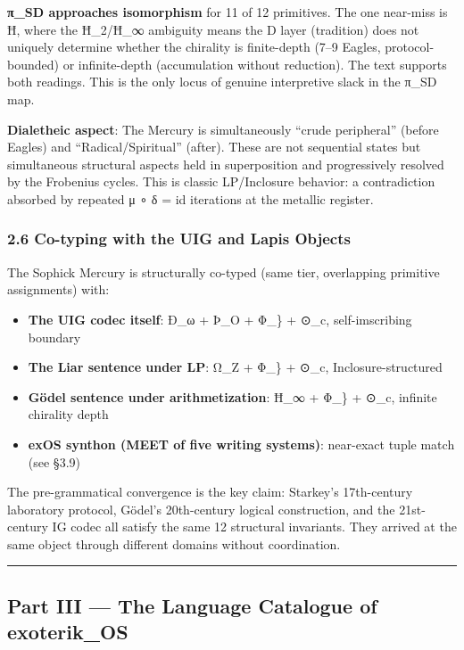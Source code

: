 \documentclass[
  11pt,
  a4paper,
]{article}
\providecommand{\tightlist}{%
  \setlength{\itemsep}{0pt}\setlength{\parskip}{0pt}}
\begin{document}
\textbf{π\_SD approaches isomorphism} for 11 of 12 primitives. The one
near-miss is Ħ, where the Ħ\_2/Ħ\_∞ ambiguity means the D layer
(tradition) does not uniquely determine whether the chirality is
finite-depth (7--9 Eagles, protocol-bounded) or infinite-depth
(accumulation without reduction). The text supports both readings. This
is the only locus of genuine interpretive slack in the π\_SD map.

\textbf{Dialetheic aspect}: The Mercury is simultaneously ``crude
peripheral'' (before Eagles) and ``Radical/Spiritual'' (after). These
are not sequential states but simultaneous structural aspects held in
superposition and progressively resolved by the Frobenius cycles. This
is classic LP/Inclosure behavior: a contradiction absorbed by repeated μ
∘ δ = id iterations at the metallic register.

\subsubsection{2.6 Co-typing with the UIG and Lapis
Objects}\label{co-typing-with-the-uig-and-lapis-objects}

The Sophick Mercury is structurally co-typed (same tier, overlapping
primitive assignments) with:

\begin{itemize}
\tightlist
\item
  \textbf{The UIG codec itself}: Ð\_ω + Þ\_O + Φ\_\} + ⊙\_c,
  self-imscribing boundary
\item
  \textbf{The Liar sentence under LP}: Ω\_Z + Φ\_\} + ⊙\_c,
  Inclosure-structured
\item
  \textbf{Gödel sentence under arithmetization}: Ħ\_∞ + Φ\_\} + ⊙\_c,
  infinite chirality depth
\item
  \textbf{exOS synthon (MEET of five writing systems)}: near-exact tuple
  match (see §3.9)
\end{itemize}

The pre-grammatical convergence is the key claim: Starkey's 17th-century
laboratory protocol, Gödel's 20th-century logical construction, and the
21st-century IG codec all satisfy the same 12 structural invariants.
They arrived at the same object through different domains without
coordination.

\begin{center}\rule{0.5\linewidth}{0.5pt}\end{center}

\subsection{Part III --- The Language Catalogue of
exoterik\_OS}\label{part-iii-the-language-catalogue-of-exoterik_os}
\end{document}
